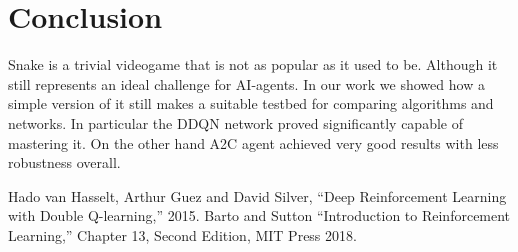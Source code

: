 \documentclass[conference]{IEEEtran}
\begin{document}
\section{Conclusion}
Snake is a trivial videogame that is not as popular as it used to be. Although it still represents an ideal challenge for AI-agents. In our work we showed how a simple version
of it still makes a suitable testbed for comparing algorithms and networks. In particular the DDQN network proved significantly capable of mastering it. On the other
hand A2C agent achieved very good results with less robustness overall.

\nocite{*}
\begin{thebibliography}{00}
 Hado van Hasselt, Arthur Guez and David Silver, ``Deep Reinforcement Learning with Double Q-learning,'' 2015.
 Barto and Sutton ``Introduction to Reinforcement Learning,'' Chapter 13, Second Edition, MIT Press 2018.
\end{thebibliography}
\end{document}
